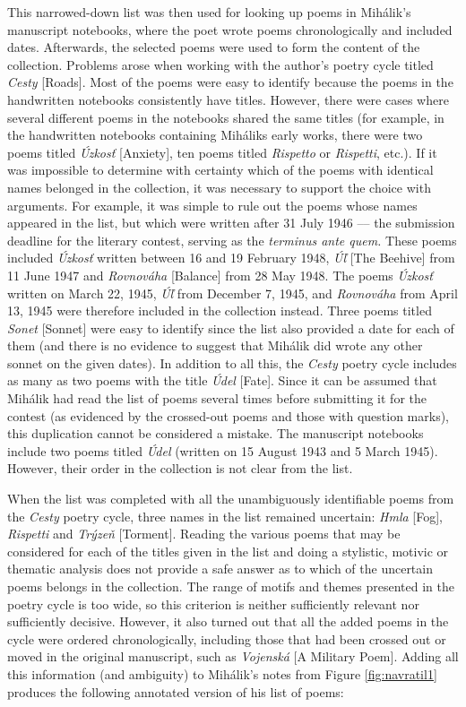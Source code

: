 \begin{paper}
This narrowed-down list was then used for looking up poems in Mihálik's
manuscript notebooks, where the poet wrote poems chronologically and
included dates. Afterwards, the selected poems were used to form the
content of the collection. Problems arose when working with the author's
poetry cycle titled \emph{Cesty} [Roads]. Most of the poems were easy to
identify because the poems in the handwritten notebooks consistently
have titles. However, there were cases where several different poems in
the notebooks shared the same titles (for example, in the handwritten
notebooks containing Mihálik\textquotesingle s early works, there were
two poems titled \emph{Úzkosť} [Anxiety], ten poems titled
\emph{Rispetto} or \emph{Rispetti}, etc.). If it was impossible to
determine with certainty which of the poems with identical names
belonged in the collection, it was necessary to support the choice with
arguments. For example, it was simple to rule out the poems whose names appeared in
the list, but which were written after 31 July 1946 –– the submission
deadline for the literary contest, serving as the \emph{terminus ante
quem.} These poems included \emph{Úzkosť} written between 16
and 19 February 1948, \emph{Úľ} [The Beehive] from 11 June 1947 and
\emph{Rovnováha} [Balance] from 28 May 1948. The poems \emph{Úzkosť}
written on March 22, 1945, \emph{Úľ} from December 7, 1945, and
\emph{Rovnováha} from April 13, 1945 were therefore included in the collection instead. Three poems
titled \emph{Sonet} [Sonnet] were easy to identify since the list also
provided a date for each of them (and there is no evidence to suggest that Mihálik did wrote any other
sonnet on the given dates). In addition to all this, the \emph{Cesty}
poetry cycle includes as many as two poems with the title \emph{Údel}
[Fate]. Since it can be assumed that Mihálik had read the list of poems
several times before submitting it for the contest (as evidenced by the
crossed-out poems and those with question marks), this duplication
cannot be considered a mistake. The manuscript notebooks include two
poems titled \emph{Údel} (written on 15 August 1943 and 5 March 1945).
However, their order in the collection is not clear from the list.
  
When the list was completed with all the unambiguously identifiable
poems from the \emph{Cesty} poetry cycle, three names in the list
remained uncertain: \emph{Hmla} [Fog], \emph{Rispetti} and \emph{Trýzeň}
[Torment]. Reading the various poems that may be considered for each of
the titles given in the list and doing a stylistic, motivic or thematic
analysis does not provide a safe answer as to which of the uncertain
poems belongs in the collection. The range of motifs and themes
presented in the poetry cycle is too wide, so this criterion is neither
sufficiently relevant nor sufficiently decisive. However, it also turned
out that all the added poems in the cycle were ordered chronologically,
including those that had been crossed out or moved in the original manuscript, such as
\emph{Vojenská} [A Military Poem]. Adding all this information (and ambiguity) to Mihálik's notes from Figure \ref{fig:navratil1} produces the following annotated version of his list of poems:



\end{paper}
